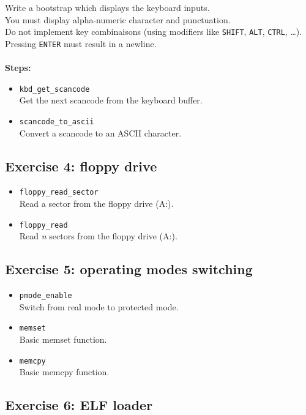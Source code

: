 Write a bootstrap which displays the keyboard inputs.\\
You must display alpha-numeric character and punctuation.\\
Do not implement key combinaisons (using modifiers like {\tt SHIFT}, {\tt ALT}, {\tt CTRL}, \ldots).\\
Pressing {\tt ENTER} must result in a newline.
\\
\\
{\bf Steps:}
  \begin{itemize}
  \item {\tt kbd\_get\_scancode}\\
  Get the next scancode from the keyboard buffer.
  \item {\tt scancode\_to\_ascii}\\
  Convert a scancode to an ASCII character.
  \end{itemize}



\subsection*{Exercise 4: floppy drive}


  \begin{itemize}
  \item {\tt floppy\_read\_sector}\\
  Read a sector from the floppy drive (A:).
  \item {\tt floppy\_read}\\
  Read {\em n} sectors from the floppy drive (A:).
  \end{itemize}

\subsection*{Exercise 5: operating modes switching}


  \begin{itemize}
  \item {\tt pmode\_enable}\\
  Switch from real mode to protected mode.
  \item {\tt memset}\\
  Basic memset function.
  \item {\tt memcpy}\\
  Basic memcpy function.
  \end{itemize}

\subsection*{Exercise 6: ELF loader}



